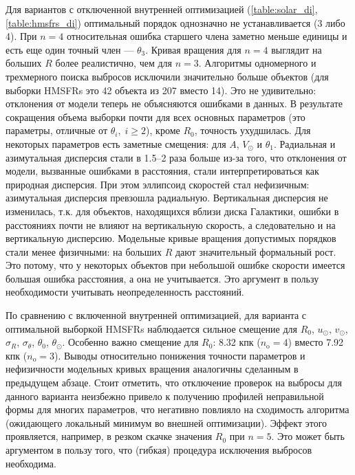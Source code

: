 \documentclass[a4paper, oneside, 14pt]{article}
\begin{document}
Для вариантов с отключенной внутренней оптимизацией (\autoref{table:solar_di}, \autoref{table:hmsfrs_di}) оптимальный порядок однозначно не устанавливается (3 либо 4). При $ n = 4 $ относительная ошибка старшего члена заметно меньше единицы и есть еще один точный член --- $ \theta_3 $. Кривая вращения для $ n = 4 $ выглядит на больших $ R $ более реалистично, чем для $ n = 3 $. Алгоритмы одномерного и трехмерного поиска выбросов исключили значительно больше объектов (для выборки HMSFRs это 42 объекта из 207 вместо 14). Это не удивительно: отклонения от модели теперь не объясняются ошибками в данных. В результате сокращения объема выборки почти для всех основных параметров (это параметры, отличные от $ \theta_i, \; i \ge 2 $), кроме $ R_0 $, точность ухудшилась. Для некоторых параметров есть заметные смещения: для $ A $, $ V_\odot $ и $ \theta_1 $. Радиальная и азимутальная дисперсия стали в 1.5--2 раза больше из-за того, что отклонения от модели, вызванные ошибками в расстояния, стали интерпретироваться как природная дисперсия. При этом эллипсоид скоростей стал нефизичным: азимутальная дисперсия превзошла радиальную. Вертикальная дисперсия не изменилась, т.к. для объектов, находящихся вблизи диска Галактики, ошибки в расстояниях почти не влияют на вертикальную скорость, а следовательно и на вертикальную дисперсию. Модельные кривые вращения допустимых порядков стали менее физичными: на больших $ R $ дают значительный формальный рост. Это потому, что у некоторых объектов при небольшой ошибке скорости имеется большая ошибка расстояния, а она не учитывается. Это аргумент в пользу необходимости учитывать неопределенность расстояний.

По сравнению с включенной внутренней оптимизацией, для варианта с оптимальной выборкой HMSFRs наблюдается сильное смещение для $ R_0 $, $ u_\odot $, $ v_\odot $, $ \sigma_R $, $ \sigma_\theta $, $ \theta_0 $, $ \theta_\odot $. Особенно важно смещение для $ R_0 $: 8.32 кпк ($ n_\text{o} = 4 $) вместо 7.92 кпк ($ n_\text{o} = 3 $). Выводы относительно понижения точности параметров
и нефизичности модельных кривых вращения аналогичны сделанным в предыдущем абзаце. Стоит отметить, что отключение проверок на выбросы для данного варианта неизбежно привело к получению профилей неправильной формы для многих параметров, что негативно повлияло на сходимость алгоритма (ожидающего локальный минимум во внешней оптимизации). Эффект этого проявляется, например, в резком скачке значения $ R_0 $ при $ n = 5 $. Это может быть аргументом в пользу того, что (гибкая) процедура исключения выбросов необходима.
\end{document}
